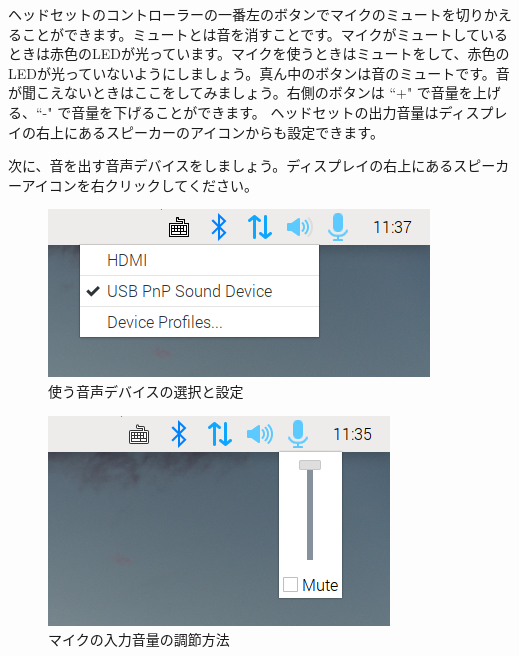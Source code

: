 ヘッドセットのコントローラーの一番左のボタンでマイクのミュートを切りかえることができます。ミュートとは音を消すことです。マイクがミュートしているときは赤色のLEDが光っています。マイクを使うときはミュートをして、赤色のLEDが光っていないようにしましょう。真ん中のボタンは音のミュートです。音が聞こえないときはここをしてみましょう。右側のボタンは ``+" で音量を上げる、``-" で音量を下げることができます。
ヘッドセットの出力音量はディスプレイの右上にあるスピーカーのアイコンからも設定できます。

次に、音を出す音声デバイスをしましょう。ディスプレイの右上にあるスピーカーアイコンを右クリックしてください。

\begin{minipage}[t]{0.48\linewidth}
    \begin{figure}[H]
        \begin{center}
            \includegraphics[width=\linewidth]{images/select_sink.png}
            \caption{使う音声デバイスの選択と設定}
            \label{使う音声デバイスの選択と設定}
        \end{center}
    \end{figure}
\end{minipage}
\begin{minipage}[t]{0.48\linewidth}
    \begin{figure}[H]
        \begin{center}
            \includegraphics[width=\linewidth]{images/microphone_volume.png}
            \caption{マイクの入力音量の調節方法}
            \label{microphone_volume}
        \end{center}
    \end{figure}
\end{minipage}

